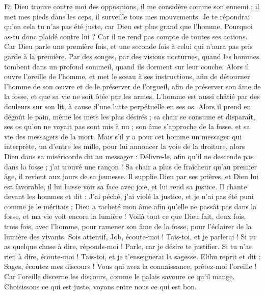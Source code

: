 \begin{multicols}{2}
Et Dieu trouve contre moi des oppositions, il me considère comme son ennemi ;
il met mes pieds dans les ceps, il surveille tous mes mouvements.
Je te répondrai qu'en cela tu n'as pas été juste, car Dieu est plus grand que l'homme.
Pourquoi as-tu donc plaidé contre lui ? Car il ne rend pas compte de toutes ses actions.
Car Dieu parle une première fois, et une seconde fois à celui qui n'aura pas pris garde à la première.
Par des songes, par des visions nocturnes, quand les hommes tombent dans un profond sommeil, quand ils dorment sur leur couche.
Alors il ouvre l'oreille de l'homme, et met le sceau à ses instructions,
afin de détourner l'homme de son œuvre et de le préserver de l'orgueil,
afin de préserver son âme de la fosse, et que sa vie ne soit ôtée par les armes.
L'homme est aussi châtié par des douleurs sur son lit, à cause d'une lutte perpétuelle en ses os.
Alors il prend en dégoût le pain, même les mets les plus désirés ;
sa chair se consume et disparaît, ses os qu'on ne voyait pas sont mis à nu ;
son âme s'approche de la fosse, et sa vie des messagers de la mort.
Mais s'il y a pour cet homme un messager qui interprète, un d'entre les mille, pour lui annoncer la voie de la droiture,
alors Dieu dans sa miséricorde dit au messager : Délivre-le, afin qu'il ne descende pas dans la fosse ; j'ai trouvé une rançon !
Sa chair a plus de fraîcheur qu'au premier âge, il revient aux jours de sa jeunesse.
Il supplie Dieu par ses prières, et Dieu lui est favorable, il lui laisse voir sa face avec joie, et lui rend sa justice.
Il chante devant les hommes et dit : J'ai péché, j'ai violé la justice, et je n'ai pas été puni comme je le méritais ;
Dieu a racheté mon âme afin qu'elle ne passât pas dans la fosse, et ma vie voit encore la lumière !
Voilà tout ce que Dieu fait, deux fois, trois fois, avec l'homme,
pour ramener son âme de la fosse, pour l'éclairer de la lumière des vivants.
Sois attentif, Job, écoute-moi ! Tais-toi, et je parlerai !
Si tu as quelque chose à dire, réponds-moi ! Parle, car je désire te justifier.
Si tu n'as rien à dire, écoute-moi ! Tais-toi, et je t'enseignerai la sagesse.
\VerseOne{}Elihu reprit et dit :
Sages, écoutez mes discours ! Vous qui avez la connaissance, prêtez-moi l'oreille !
Car l'oreille discerne les discours, comme le palais savoure ce qu'il mange.
Choisissons ce qui est juste, voyons entre nous ce qui est bon.

\end{multicols}
